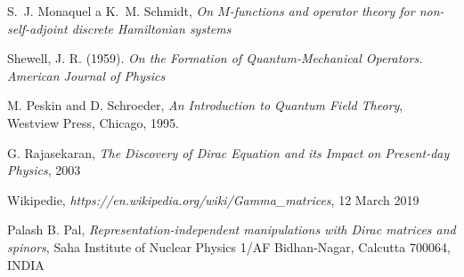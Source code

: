 \begin{thebibliography}{10}

    S.~J. Monaquel a K.~M. Schmidt, \textit{On $M$-functions and operator
      theory for non-self-adjoint discrete Hamiltonian systems}

        Shewell, J. R. (1959). \textit{On the Formation of Quantum-Mechanical 
        Operators. American Journal of Physics}

        M. Peskin and D. Schroeder, \textit{An Introduction to Quantum Field Theory},
        Westview Press, Chicago, 1995.

        G. Rajasekaran, \textit{The Discovery of Dirac Equation and its Impact on Present-day Physics},
        2003

        Wikipedie, \textit{https://en.wikipedia.org/wiki/Gamma\_matrices},
        12 March 2019

        Palash B. Pal, \textit{Representation-independent manipulations with Dirac matrices and spinors},
        Saha Institute of Nuclear Physics 1/AF Bidhan-Nagar, Calcutta 700064, INDIA

\end{thebibliography}

\cleardoublepage

